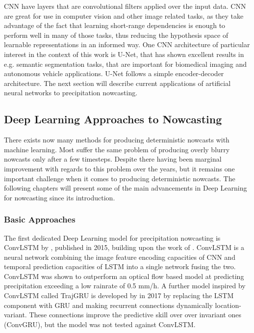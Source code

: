 CNN have layers that are convolutional filters applied over the input data. CNN are great for use in computer vision and other image related tasks, as they take advantage of the fact that learning short-range dependencies is enough to perform well in many of those tasks, thus reducing the hypothesis space of learnable representations in an informed way. One CNN architecture of particular interest in the context of this work is U-Net, that has shown excellent results in e.g. semantic segmentation tasks, that are important for biomedical imaging and autonomous vehicle applications. U-Net follows a simple encoder-decoder architecture. The next section will describe current applications of artificial neural networks to precipitation nowcasting.



\subsection{Deep Learning Approaches to Nowcasting}


There exists now many methods for producing deterministic nowcasts with machine learning. Most suffer the same problem of producing overly blurry nowcasts only after a few timesteps. Despite there having been marginal improvement with regards to this problem over the years, but it remains one important challenge when it comes to producing deterministic nowcasts. The following chapters will present some of the main advancements in Deep Learning for nowcasting since its introduction.

\subsubsection*{Basic Approaches}
 
The first dedicated Deep Learning model for precipitation nowcasting is ConvLSTM by \citet{shi_convolutional_2015}, published in 2015, building upon the work of \citet{oh_action-conditional_2015}. ConvLSTM is a neural network combining the image feature encoding capacities of CNN and  temporal prediction capacities of LSTM into a single network fusing the two. ConvLSTM was shown to outperform an optical flow based model at predicting precipitation exceeding a low rainrate of 0.5 mm/h. 
A further model inspired by ConvLSTM called TrajGRU is developed by \citet{shi_deep_2017} in 2017 by replacing the LSTM component with GRU and making recurrent connections dynamically location-variant. These connections improve the predictive skill over over invariant ones (ConvGRU), but the model was not tested against ConvLSTM. 

